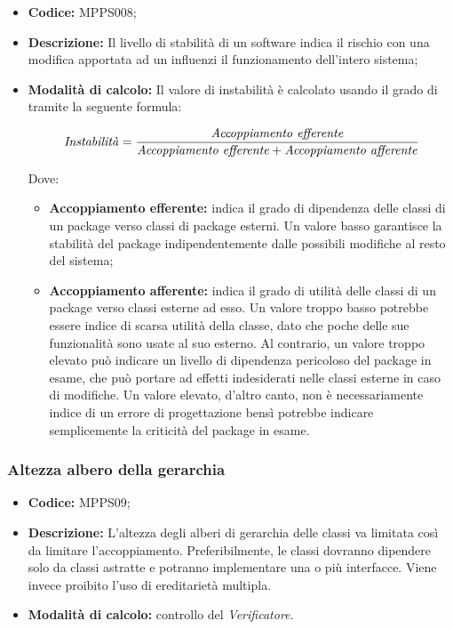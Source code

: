 \documentclass[../NormediProgetto.tex]{subfiles}
\begin{document}
\begin{itemize}
	\item \textbf{Codice:} MPPS008;
	
	\item \textbf{Descrizione:} Il livello di stabilità di un software indica il rischio con una modifica apportata ad un  influenzi il funzionamento dell'intero sistema;
	
	\item \textbf{Modalità di calcolo:} Il valore di instabilità è calcolato usando il grado di  tramite la seguente formula:
	
	\[ \textrm{\textit{Instabilità}} = \frac{\textrm{\textit{Accoppiamento efferente}}}{\textrm{\textit{Accoppiamento efferente}} + \textrm{\textit{Accoppiamento afferente}}} \]
	
	Dove:
	
	\begin{itemize}
		\item \textbf{Accoppiamento efferente:} indica il grado di dipendenza delle classi di un package verso classi di package esterni. Un valore basso garantisce la stabilità del package indipendentemente dalle possibili modifiche al resto del sistema;
		
		\item \textbf{Accoppiamento afferente:} indica il grado di utilità delle classi di un package verso classi esterne ad esso. Un valore troppo basso potrebbe essere indice di scarsa utilità della classe, dato che poche delle sue funzionalità sono usate al suo esterno. Al contrario, un valore troppo elevato può indicare un livello di dipendenza pericoloso del package in esame, che può portare ad effetti indesiderati nelle classi esterne in caso di modifiche. Un valore elevato, d'altro canto, non è necessariamente indice di un errore di progettazione bensì potrebbe indicare semplicemente la criticità del package in esame.
	\end{itemize}
	
\end{itemize}

\subsubsection{Altezza albero della gerarchia}

\begin{itemize}
	
	\item \textbf{Codice:} MPPS09;
	
	\item \textbf{Descrizione:} L'altezza degli alberi di gerarchia delle classi va limitata così da limitare l'accoppiamento. Preferibilmente, le classi dovranno dipendere solo da classi astratte e potranno implementare una o più interfacce. Viene invece proibito l'uso di ereditarietà multipla.
	
	\item \textbf{Modalità di calcolo:} controllo del \textit{Verificatore}.
\end{itemize}
\end{document}
